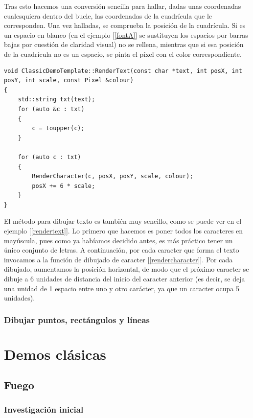 Tras esto hacemos una conversión sencilla para hallar, dadas unas coordenadas cualesquiera dentro del bucle, las coordenadas de la cuadrícula que le corresponden. Una vez halladas, se comprueba la posición de la cuadrícula. Si es un espacio en blanco (en el ejemplo [\ref{fontA}] se sustituyen los espacios por barras bajas por cuestión de claridad visual) no se rellena, mientras que si esa posición de la cuadrícula no es un espacio, se pinta el píxel con el color correspondiente.\\

\begin{lstlisting}[style=C-color, caption={Método que renderiza una cadena de caracteres},label=rendertext]
void ClassicDemoTemplate::RenderText(const char *text, int posX, int posY, int scale, const Pixel &colour)
{
    std::string txt(text);
    for (auto &c : txt)
    {
        c = toupper(c);
    }

    for (auto c : txt)
    {
        RenderCharacter(c, posX, posY, scale, colour);
        posX += 6 * scale;
    }
}
\end{lstlisting}

El método para dibujar texto es también muy sencillo, como se puede ver en el ejemplo [\ref{rendertext}]. Lo primero que hacemos es poner todos los caracteres en mayúscula, pues como ya habíamos decidido antes, es más práctico tener un único conjunto de letras. A continuación, por cada caracter que forma el texto invocamos a la función de dibujado de caracter [\ref{rendercharacter}]. Por cada dibujado, aumentamos la posición horizontal, de modo que el próximo caracter se dibuje a 6 unidades de distancia del inicio del caracter anterior (es decir, se deja una unidad de 1 espacio entre uno y otro carácter, ya que un caracter ocupa 5 unidades).

\subsection{Dibujar puntos, rectángulos y líneas}

\chapter{Demos clásicas}

\section{Fuego}

\subsection{Investigación inicial}
